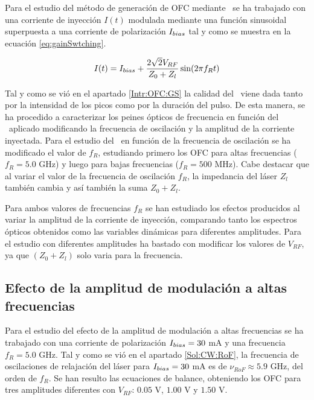 
Para el estudio del m\'etodo de generaci\'on de OFC mediante \gs\ se ha trabajado con una corriente de inyecci\'on $I(t)$ modulada mediante una función sinusoidal superpuesta a una corriente de polarización $I_{bias}$ tal y como se muestra en la ecuación \ref{eq:gainSwtching}.

	\begin{equation}
		I(t) = I_{bias} + \frac{2\sqrt{2}V_{RF}}{Z_0+Z_l} \sin(2\pi f_R t)
		\label{eq:gainSwtching}
	\end{equation}

	Tal y como se vi\'o en el apartado \ref{Intr:OFC:GS} la calidad del \gs\ viene dada tanto por la intensidad de los picos como por la duraci\'on del pulso. De esta manera, se ha procedido a caracterizar los peines \'opticos de frecuencia en funci\'on del \gs\ aplicado modificando la frecuencia de oscilaci\'on y la amplitud de la corriente inyectada. Para el estudio del \gs\ en función de la frecuencia de oscilaci\'on se ha modificado el valor de $f_R$, estudiando primero los OFC para altas frecuencias ($f_R = 5.0$ GHz) y luego para bajas frecuencias ($f_R = 500$ MHz). Cabe destacar que al variar el valor de la frecuencia de oscilaci\'on $f_R$, la impedancia del l\'aser $Z_l$ tambi\'en cambia y as\'i también la suma $Z_0 + Z_l$.

	Para ambos valores de frecuencias $f_R$ se han estudiado los efectos producidos al variar la amplitud de la corriente de inyecci\'on, comparando tanto los espectros ópticos obtenidos como las variables dinámicas para diferentes amplitudes. Para el estudio con diferentes amplitudes ha bastado con modificar los valores de $V_{RF}$, ya que $(Z_0 + Z_l)$ solo varia para la frecuencia.

	\subsection{Efecto de la amplitud de modulación a altas frecuencias}
		\label{Sol:OFC:HgFreq}

		Para el estudio del efecto de la amplitud de modulación a altas frecuencias se ha trabajado con una corriente de polarización $I_{bias} = 30$ mA y una frecuencia $f_R = 5.0$ GHz. Tal y como se vi\'o en el apartado \ref{Sol:CW:RoF}, la frecuencia de oscilaciones de relajación del l\'aser para $I_{bias} = 30$ mA es de $\nu_{RoF} \approx 5.9$ GHz, del orden de $f_R$. Se han resulto las ecuaciones de balance, obteniendo los OFC para tres amplitudes diferentes con $V_{RF}$: $0.05$ V, $1.00$ V y $1.50$ V. 

